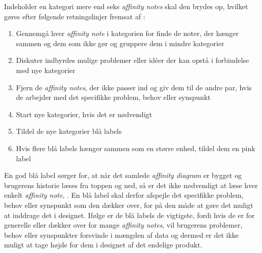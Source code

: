 Indeholder en kategori mere end seks \textit{affinity notes} skal den brydes op, hvilket gøres efter følgende retningslinjer fremsat af \textcite[s. 170]{Book:BuildingAnAffinity}:\blankline
%
\begin{enumerate}
  \item Gennemgå hver \textit{affinity note} i kategorien for finde de noter, der hænger sammen og dem som ikke gør og gruppere dem i mindre kategorier
  \item Diskuter indbyrdes mulige problemer eller idéer der kan opstå i forbindelse med nye kategorier
  \item Fjern de \textit{affinity notes}, der ikke passer ind og giv dem til de andre par, hvis de arbejder med det specifikke problem, behov eller synspunkt
  \item Start nye kategorier, hvis det er nødvendigt 
  \item Tildel de nye kategorier blå labels
  \item Hvis flere blå labels hænger sammen som en større enhed, tildel dem en pink label\blankline 
\end{enumerate}
%
En god blå label sørger for, at når det samlede \textit{affinity diagram} er bygget og brugerens historie læses fra toppen og ned, så er det ikke nødvendigt at læse hver enkelt \textit{affinity note}, \parencite[ss. 170-171]{Book:BuildingAnAffinity}. En blå label skal derfor afspejle det specifikke problem, behov eller synspunkt som den dækker over, for på den måde at gøre det muligt at inddrage det i designet. Ifølge \textcite[s. 171]{Book:BuildingAnAffinity} er de blå labels de vigtigste, fordi hvis de er for generelle eller dækker over for mange \textit{affinity notes}, vil brugerens problemer, behov eller synspunkter forsvinde i mængden af data og dermed er det ikke muligt at tage højde for dem i designet af det endelige produkt. 

